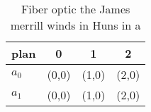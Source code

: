 \documentclass[a4paper]{article}
\begin{document}
\begin{table}
\begin{adjustbox}{width=0.6\columnwidth}
\begin{tabular}{|l|l|l|l|}
\hline
\textbf{plan} & \multicolumn{1}{c|}{\textbf{0}} & \multicolumn{1}{c|}{\textbf{1}} & \multicolumn{1}{c|}{\textbf{2}} \\ \hline
\textbf{$a_0$}  & (0,0) & (1,0) & (2,0) \\ \hline
\textbf{$a_1$}  & (0,0) & (1,0) & (2,0) \\ \hline
\end{tabular}
\end{adjustbox}
\caption{Fiber optic the James merrill winds in Huns in a 
}
\end{table}
\end{document}
